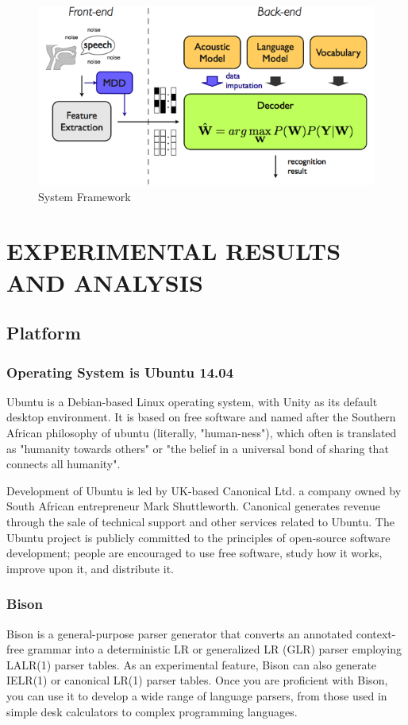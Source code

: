 \documentclass[12pt,a4paper,oldfontcommands]{memoir}
\begin{document}
\begin{figure}[h]
    \centering
    \includegraphics[scale=0.5]{mdt_recognizer}
    \caption{System Framework}
\end{figure}

\chapter{EXPERIMENTAL RESULTS AND ANALYSIS}
\section{Platform}
\subsection{Operating System is Ubuntu 14.04}
Ubuntu is a Debian-based Linux operating system, with Unity as its default desktop environment. It is based on free software and named after the Southern African philosophy of ubuntu (literally, "human-ness"), which often is translated as "humanity towards others" or "the belief in a universal bond of sharing that connects all humanity".

Development of Ubuntu is led by UK-based Canonical Ltd. a company owned by South African entrepreneur Mark Shuttleworth. Canonical generates revenue through the sale of technical support and other services related to Ubuntu. The Ubuntu project is publicly committed to the principles of open-source software development; people are encouraged to use free software, study how it works, improve upon it, and distribute it\cite{24}.
\subsection{Bison}
Bison is a general-purpose parser generator that converts an annotated context-free grammar into a deterministic LR or generalized LR (GLR) parser employing LALR(1) parser tables. As an experimental feature, Bison can also generate IELR(1) or canonical LR(1) parser tables. Once you are proficient with Bison, you can use it to develop a wide range of language parsers, from those used in simple desk calculators to complex programming languages.
\end{document}
